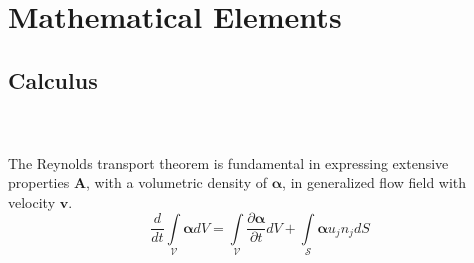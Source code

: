 \chapter{Mathematical Elements}

\section{Calculus}
\begin{teo}
\begin{gather}
    \label{gauss_theorem}
\end{gather}
\end{teo}

\begin{teo}
\begin{gather}
    \label{stokes_theorem}
\end{gather}
\end{teo}

\begin{teo}
The Reynolds transport theorem is fundamental in expressing extensive properties $\boldsymbol{A}$, with a volumetric density of $\boldsymbol\alpha$, in generalized flow field with velocity $\textbf{v}$.
\begin{equation}
    \label{reynolds_theorem}
\frac{d}{dt} \int\limits_{\mathcal{V}}  \boldsymbol\alpha dV
=\int\limits_{\mathcal{V}} \frac{\partial \boldsymbol\alpha}{\partial t} dV
+\int\limits_{\mathcal{S}} \boldsymbol\alpha u_j n_j dS
\end{equation}
\end{teo}



\newpage
